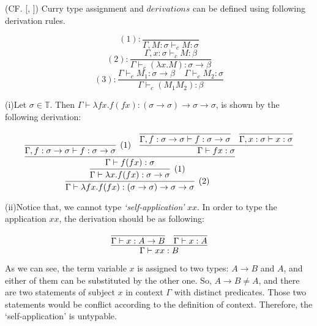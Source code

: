 \begin{def1}
\normalfont (CF. [\cite{curry1934functionality}, \cite{curry1972combinatory}]) Curry type assignment and $derivations$ can be defined using following derivation rules.  
\end{def1}

\begin{equation*}
(1):\frac{}{\Gamma ,M:\sigma \vdash _cM:\sigma} 
\end{equation*}
\begin{equation*}
(2):\frac{\Gamma ,x:\sigma \vdash _cM:\beta}{\Gamma \vdash _c(\lambda x.M):\sigma \rightarrow \beta} 
\end{equation*}
\begin{equation*}
(3):\frac{\Gamma \vdash _cM_1:\sigma \rightarrow \beta\ \ \ \ \ \Gamma \vdash _cM_2:\sigma}{\Gamma \vdash _c(M_1M_2):\beta} 
\end{equation*}

\begin{exmp}\label{exp}
\normalfont (i)Let $\sigma \in \mathbb{T}$. Then $\Gamma \vdash \lambda fx.f(fx):(\sigma \rightarrow \sigma)\rightarrow \sigma \rightarrow \sigma$, is shown by the following derivation:
\end{exmp}

$$
\infer[(2)]{\Gamma \vdash \lambda fx.f(fx):(\sigma \rightarrow \sigma)\rightarrow \sigma \rightarrow \sigma}{
	\infer[(1)]{\Gamma \vdash \lambda x.f(fx):\sigma \rightarrow \sigma}{
      \infer{\Gamma \vdash f(fx):\sigma}{
             \infer[(1)]{\Gamma,f:\sigma \rightarrow \sigma \vdash f:\sigma \rightarrow \sigma}{}
             & 
             \infer{\Gamma \vdash fx:\sigma}{
                \infer{\Gamma,f:\sigma \rightarrow \sigma \vdash f:\sigma \rightarrow \sigma}{}
                &
                \infer{\Gamma,x:\sigma \vdash x:\sigma}{}
             }
         }
      }		
	}
$$


(ii)Notice that, we cannot type \textit{`self-application'} $xx$. In order to type the application $xx$, the derivation should be as following:

$$
\infer{\Gamma \vdash xx:B}{
    \infer{\Gamma \vdash x:A \rightarrow B}{} 
    &
    \infer{\Gamma \vdash x:A}{}
}
$$


As we can see, the term variable $x$ is assigned to two types: $A \rightarrow B$ and $A$, and either of them can be substituted by the other one. So, $A \rightarrow B \neq A$, and there are two statements of subject $x$ in context $\Gamma$ with distinct predicates. Those two statements would be conflict according to the definition of context. Therefore, the `self-application' is untypable. 



